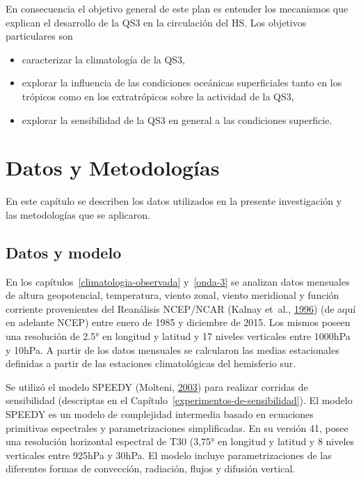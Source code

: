 \documentclass[spanish,a4paper,12pt]{book}
\providecommand{\tightlist}{%
  \setlength{\itemsep}{0pt}\setlength{\parskip}{0pt}}
\begin{document}
En consecuencia el objetivo general de este plan es entender los
mecanismos que explican el desarrollo de la QS3 en la circulación del
HS. Los objetivos particulares son

\begin{itemize}
\tightlist
\item
  caracterizar la climatología de la QS3,
\item
  explorar la influencia de las condiciones oceánicas superficiales
  tanto en los trópicos como en los extratrópicos sobre la actividad de
  la QS3,
\item
  explorar la sensibilidad de la QS3 en general a las condiciones
  superficie.
\end{itemize}

\chapter{Datos y Metodologías}\label{datos-y-metodologias}

En este capítulo se describen los datos utilizados en la presente
investigación y las metodologías que se aplicaron.

\section{Datos y modelo}\label{datos-y-modelo}

En los capítulos~\ref{climatologia-observada} y~\ref{onda-3} se analizan
datos mensuales de altura geopotencial, temperatura, viento zonal,
viento meridional y función corriente provenientes del Reanálisis
NCEP/NCAR (Kalnay et~al., \protect\hyperlink{ref-Kalnay1996}{1996}) (de
aquí en adelante NCEP) entre enero de 1985 y diciembre de 2015. Los
mismos poseen una resolución de 2.5° en longitud y latitud y 17 niveles
verticales entre 1000hPa y 10hPa. A partir de los datos mensuales se
calcularon las medias estacionales definidas a partir de las estaciones
climatológicas del hemisferio sur.

Se utilizó el modelo SPEEDY (Molteni,
\protect\hyperlink{ref-Molteni2003}{2003}) para realizar corridas de
sensibilidad (descriptas en el
Capítulo~\ref{experimentos-de-sensibilidad}). El modelo SPEEDY es un
modelo de complejidad intermedia basado en ecuaciones primitivas
espectrales y parametrizaciones simplificadas. En su versión 41, posee
una resolución horizontal espectral de T30 (3,75° en longitud y latitud
y 8 niveles verticales entre 925hPa y 30hPa. El modelo incluye
parametrizaciones de las diferentes formas de convección, radiación,
flujos y difusión vertical.
\end{document}
